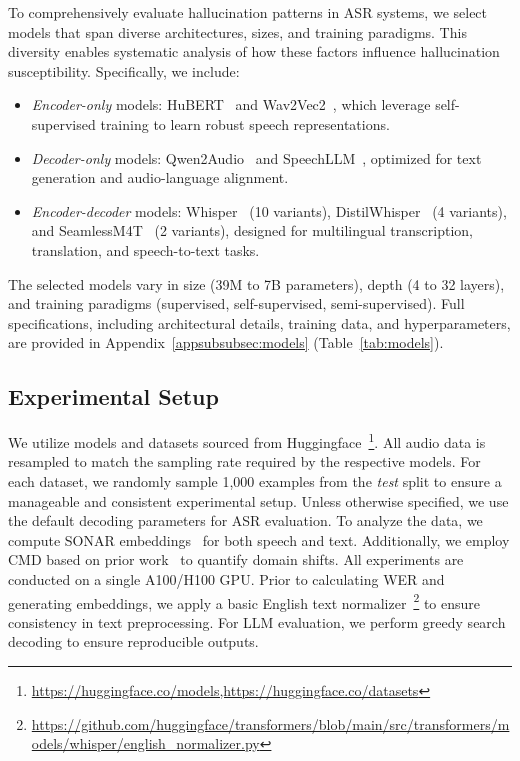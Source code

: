 To comprehensively evaluate hallucination patterns in ASR systems, we select models that span diverse architectures, sizes, and training paradigms. This diversity enables systematic analysis of how these factors influence hallucination susceptibility. Specifically, we include:  
\begin{itemize}  
    \item \emph{Encoder-only} models: HuBERT~\cite{hsu2021hubert} and Wav2Vec2~\cite{baevski2020wav2vec}, which leverage self-supervised training to learn robust speech representations.  
    \item \emph{Decoder-only} models: Qwen2Audio~\cite{chu2024qwen2} and SpeechLLM~\cite{Rajaa_SpeechLLM_Multi-Modal_LLM}, optimized for text generation and audio-language alignment.  
    \item \emph{Encoder-decoder} models: Whisper~\cite{radford2022robustspeechrecognitionlargescale} (10 variants), DistilWhisper~\cite{gandhi2023distilwhisper} (4 variants), and SeamlessM4T~\cite{communication2023seamlessm4tmassivelymultilingual} (2 variants), designed for multilingual transcription, translation, and speech-to-text tasks.  
\end{itemize}  
The selected models vary in size (39M to 7B parameters), depth (4 to 32 layers), and training paradigms (supervised, self-supervised, semi-supervised). Full specifications, including architectural details, training data, and hyperparameters, are provided in Appendix~\ref{appsubsubsec:models} (Table~\ref{tab:models}).  






\subsection{Experimental Setup}
We utilize models and datasets sourced from Huggingface~\footnote{\url{https://huggingface.co/models,https://huggingface.co/datasets}}. All audio data is resampled to match the sampling rate required by the respective models. For each dataset, we randomly sample 1,000 examples from the \textit{test} split to ensure a manageable and consistent experimental setup. Unless otherwise specified, we use the default decoding parameters for ASR evaluation. To analyze the data, we compute SONAR embeddings~\cite{duquenne2023sonar} for both speech and text. Additionally, we employ CMD based on prior work~\cite{kashyap2020domain} to quantify domain shifts. All experiments are conducted on a single A100/H100 GPU. Prior to calculating WER and generating embeddings, we apply a basic English text normalizer~\footnote{\url{https://github.com/huggingface/transformers/blob/main/src/transformers/models/whisper/english_normalizer.py}} to ensure consistency in text preprocessing. For LLM evaluation, we perform greedy search decoding to ensure reproducible outputs. 


